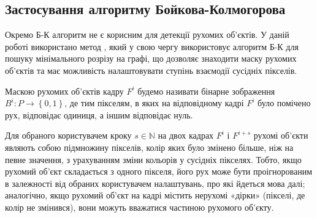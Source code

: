 \subsection{Застосування алгоритму Бойкова-Колмогорова}

Окремо Б-К алгоритм не є корисним для детекції рухомих об'єктів. У даній роботі
використано метод \cite{bib:pavliuk_krygin}, який у свою чергу використовує алгоритм Б-К
для пошуку мінімального розрізу на графі, що дозволяє знаходити
маску рухомих об'єктів та має можливість налаштовувати ступінь взаємодії сусідніх
пікселів.
\begin{definition}
	Маскою рухомих об'єктів кадру \(F^{i}\) будемо називати бінарне
	зображення \(B^{i}:P \rightarrow \left\{ 0,1 \right\}\), де тим
	пікселям, в яких на відповідному кадрі \(F^{i}\) було помічено рух,
	відповідає одиниця, а іншим відповідає нуль.
\end{definition}

Для обраного користувачем
кроку $s \in \mathbb{N}$ на двох кадрах \(F^{i}\) і \(F^{i + s}\) рухомі об'єкти
являють собою підмножину пікселів, колір яких було змінено більше, ніж
на певне значення, з урахуванням зміни кольорів у сусідніх пікселях.
Тобто, якщо рухомий об'єкт складається з одного пікселя, його рух може
бути проігнорованим в залежності від обраних користувачем налаштувань,
про які йдеться мова далі; аналогічно, якщо рухомий об'єкт на кадрі
містить нерухомі «дірки» (пікселі, де колір не змінився), вони можуть
вважатися частиною рухомого об'єкту.

